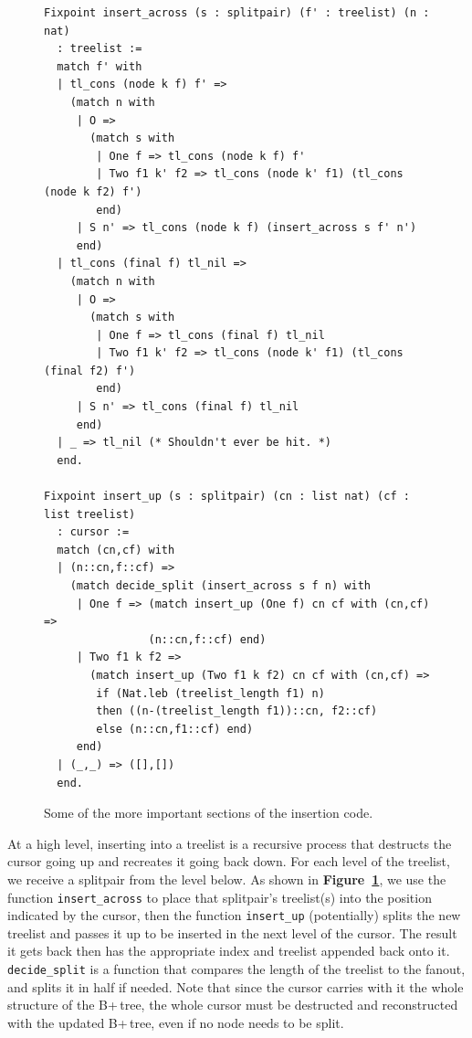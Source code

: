 \documentclass[12pt]{article}
\begin{document}
\begin{singlespace}
\begin{figure}[hpt]
\begin{verbatim}
Fixpoint insert_across (s : splitpair) (f' : treelist) (n : nat)
  : treelist :=
  match f' with
  | tl_cons (node k f) f' =>
    (match n with
     | O =>
       (match s with
        | One f => tl_cons (node k f) f'
        | Two f1 k' f2 => tl_cons (node k' f1) (tl_cons (node k f2) f')
        end)
     | S n' => tl_cons (node k f) (insert_across s f' n')
     end)
  | tl_cons (final f) tl_nil =>
    (match n with
     | O =>
       (match s with
        | One f => tl_cons (final f) tl_nil
        | Two f1 k' f2 => tl_cons (node k' f1) (tl_cons (final f2) f')
        end)
     | S n' => tl_cons (final f) tl_nil
     end)
  | _ => tl_nil (* Shouldn't ever be hit. *)
  end.

Fixpoint insert_up (s : splitpair) (cn : list nat) (cf : list treelist)
  : cursor :=
  match (cn,cf) with
  | (n::cn,f::cf) =>
    (match decide_split (insert_across s f n) with
     | One f => (match insert_up (One f) cn cf with (cn,cf) =>
                (n::cn,f::cf) end)
     | Two f1 k f2 =>
       (match insert_up (Two f1 k f2) cn cf with (cn,cf) =>
        if (Nat.leb (treelist_length f1) n)
        then ((n-(treelist_length f1))::cn, f2::cf)
        else (n::cn,f1::cf) end)
     end)
  | (_,_) => ([],[])
  end.
\end{verbatim}
\caption{Some of the more important sections of the insertion code.}
\label{fig:insert}
\end{figure}
\end{singlespace}

At a high level, inserting into a treelist is a recursive process that destructs the cursor going up and recreates it going back down. For each level of the treelist, we receive a splitpair from the level below. As shown in \textbf{Figure~\ref{fig:insert}}, we use the function \texttt{insert\_across} to place that splitpair’s treelist(s) into the position indicated by the cursor, then the function \texttt{insert\_up} (potentially) splits the new treelist and passes it up to be inserted in the next level of the cursor. The result it gets back then has the appropriate index and treelist appended back onto it. \texttt{decide\_split} is a function that compares the length of the treelist to the fanout, and splits it in half if needed. Note that since the cursor carries with it the whole structure of the B+\,tree, the whole cursor must be destructed and reconstructed with the updated B+\,tree, even if no node needs to be split.
\end{document}
